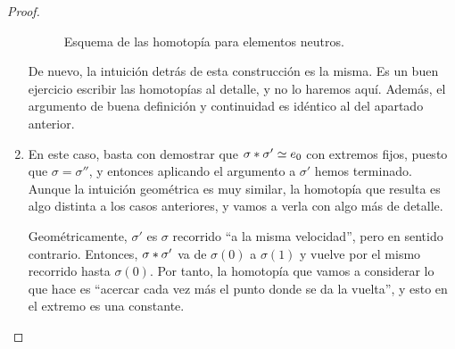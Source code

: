 \begin{lem}
\begin{proof}
\begin{enumerate}
\begin{figure}[h!]
{}
				
				\caption{Esquema de las homotopía para elementos neutros.}
			\end{figure}
		
			De nuevo, la intuición detrás de esta construcción es la misma. Es un buen ejercicio escribir las homotopías al detalle, y no lo haremos aquí. Además, el argumento de buena definición y continuidad es idéntico al del apartado anterior.
			
			\item En este caso, basta con demostrar que $\sigma\pathp\sigma' \homot e_0$ con extremos fijos, puesto que $\sigma=\sigma''$, y entonces aplicando el argumento a $\sigma'$ hemos terminado. Aunque la intuición geométrica es muy similar, la homotopía que resulta es algo distinta a los casos anteriores, y vamos a verla con algo más de detalle.
			
			Geométricamente, $\sigma'$ es $\sigma$ recorrido ``a la misma velocidad'', pero en sentido contrario. Entonces, $\sigma\pathp\sigma'$ va de $\sigma(0)$ a $\sigma(1)$ y vuelve por el mismo recorrido hasta $\sigma(0)$. Por tanto, la homotopía que vamos a considerar lo que hace es ``acercar cada vez más el punto donde se da la vuelta'', y esto en el extremo es una constante.
			
			\begin{figure}[h!]
				\label{grf_fig_homot_3}
				\centering
				\begin{tikzpicture}[
				decoration={markings,mark=at position 0.5 with {\arrow{>}}},
				witharrow/.style={postaction={decorate}},
				vdot/.style={rectangle, fill, inner sep=0pt, outer sep=0pt, minimum width=0.5pt, minimum height=6pt},
				dot/.style={draw,fill,circle,inner sep=1.5pt,minimum width=0pt, scale=0.45}
				]
				

\end{tikzpicture}
\end{figure}
\end{enumerate}
\end{proof}
\end{lem}
